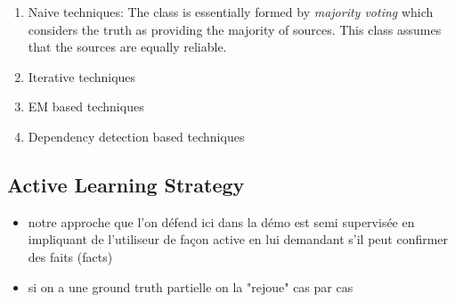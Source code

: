 \begin{enumerate}
 \item Naive techniques: The class is essentially formed by \emph{majority voting} which considers the truth as providing the majority of 
sources. This class assumes that the sources are equally reliable.
 \item Iterative techniques
 \item EM based techniques
 \item Dependency detection based techniques
\end{enumerate}



\subsection{Active Learning Strategy}
\begin{itemize}
 \item notre approche que l'on défend ici dans la démo est  semi supervisée en impliquant de l'utiliseur de façon active
en lui demandant s'il peut confirmer des faits (facts)
\item si on a une ground truth partielle on la "rejoue" cas par cas
\end{itemize}

